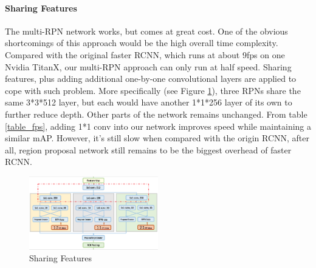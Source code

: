 \documentclass[10pt,twocolumn,letterpaper]{article}
\begin{document}
\paragraph{Sharing Features}
The multi-RPN network works, but comes at great cost. One of the obvious shortcomings of this approach would be the high overall time complexity. Compared with the original faster RCNN, which runs at about 9fps on one Nvidia TitanX, our multi-RPN approach can only run at half speed. Sharing features, plus adding additional one-by-one convolutional layers are applied to cope with such problem. More specifically (see Figure \ref{ARS_sh}), three RPNs share the same 3*3*512 layer, but each would have another 1*1*256 layer of its own to further reduce depth. Other parts of the network remains unchanged. From table \ref{table_fps}, adding 1*1 conv into our network improves speed while maintaining a similar mAP. However, it's still slow when compared with the origin RCNN, after all, region proposal network still remains to be the biggest overhead of faster RCNN.
    \begin{figure}[!htb]
    \includegraphics[width= 0.5\textwidth]{pic/ARS-archi-share.png}
    \caption{Sharing Features}
    \label{ARS_sh}
    \end{figure}

\begin{table}[ht]
\centering
{}
\caption{Time complexity under different settings, all reported on one Nvidia TitanX. Adding 1*1 conv into our network improves speed while maintaining a similar mAP.}
\label{table_fps}
\end{table}
\end{document}
